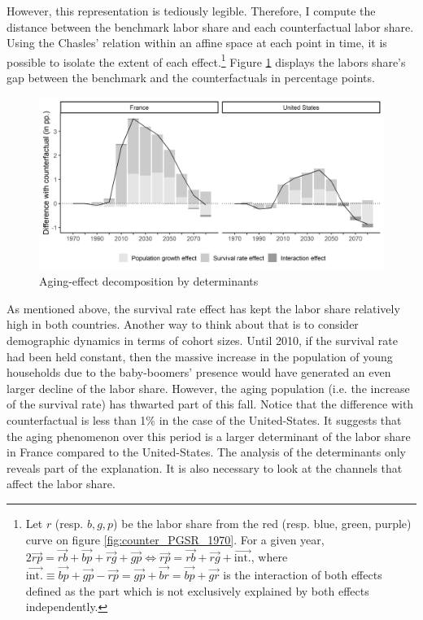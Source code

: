 However, this representation is tediously legible. Therefore, I compute the distance between the benchmark labor share and each counterfactual labor share. Using the Chasles' relation within an affine space at each point in time, it is possible to isolate the extent of each effect.\footnote{Let $r$ (resp. $b, g, p$) be the labor share from the red (resp. blue, green, purple) curve on figure \ref{fig:counter_PGSR_1970}. For a given year, $2\vec{rp} = \vec{rb} + \vec{bp} + \vec{rg} + \vec{gp} \Leftrightarrow \vec{rp} = \vec{rb} + \vec{rg} + \vec{\text{int.}}$, where $\vec{\text{int.}} \equiv \vec{bp} + \vec{gp} - \vec{rp} = \vec{gp} +\vec{br} = \vec{bp} + \vec{gr}$ is the interaction of both effects defined as the part which is not exclusively explained by both effects independently.} Figure \ref{fig:decomp_PGSR_1970} displays the labors share's gap between the benchmark and the counterfactuals in percentage points.
\begin{figure}[tb]
	\centering
	\includegraphics[width=1\linewidth]{../result/decomposition/decomp_PGSR.png}
	\caption{Aging-effect decomposition by determinants}
	\label{fig:decomp_PGSR_1970}
\end{figure}
As mentioned above, the survival rate effect has kept the labor share relatively high in both countries. Another way to think about that is to consider demographic dynamics in terms of cohort sizes. Until 2010, if the survival rate had been held constant, then the massive increase in the population of young households due to the baby-boomers' presence would have generated an even larger decline of the labor share. However, the aging population (i.e. the increase of the survival rate) has thwarted part of this fall. Notice that the difference with counterfactual is less than 1\% in the case of the United-States. It suggests that the aging phenomenon over this period is a larger determinant of the labor share in France compared to the United-States.
The analysis of the determinants only reveals part of the explanation. It is also necessary to look at the channels that affect the labor share.


